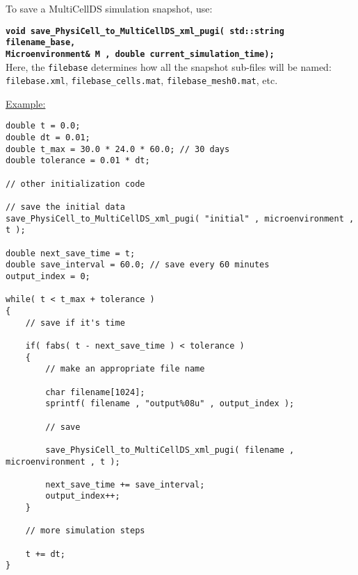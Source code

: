 \documentclass[12pt]{article}
\renewcommand{\v}{\verb}
\newcommand{\smallcode}[1]{\textbf{\texttt{#1}}}
\begin{document}
To save a MultiCellDS simulation snapshot, use: 

\smallcode{void save\_PhysiCell\_to\_MultiCellDS\_xml\_pugi( std::string filename\_base, \\
\phantom{void    }Microenvironment\& M , double current\_simulation\_time);} \\

Here, the \v|filebase| determines how all the snapshot sub-files will be named: 
\v|filebase.xml|, \v|filebase_cells.mat|, \v|filebase_mesh0.mat|, etc. 

\underline{Example:} 
\begin{verbatim}
double t = 0.0;
double dt = 0.01; 
double t_max = 30.0 * 24.0 * 60.0; // 30 days 
double tolerance = 0.01 * dt; 

// other initialization code 

// save the initial data 
save_PhysiCell_to_MultiCellDS_xml_pugi( "initial" , microenvironment , t ); 

double next_save_time = t; 
double save_interval = 60.0; // save every 60 minutes 
output_index = 0; 

while( t < t_max + tolerance )
{
    // save if it's time
    
    if( fabs( t - next_save_time ) < tolerance )
    {
        // make an appropriate file name 
    
        char filename[1024]; 
        sprintf( filename , "output%08u" , output_index ); 
        
        // save 

        save_PhysiCell_to_MultiCellDS_xml_pugi( filename , microenvironment , t ); 

        next_save_time += save_interval; 
        output_index++; 
    }

    // more simulation steps 

    t += dt; 
}
\end{verbatim}
\end{document}

